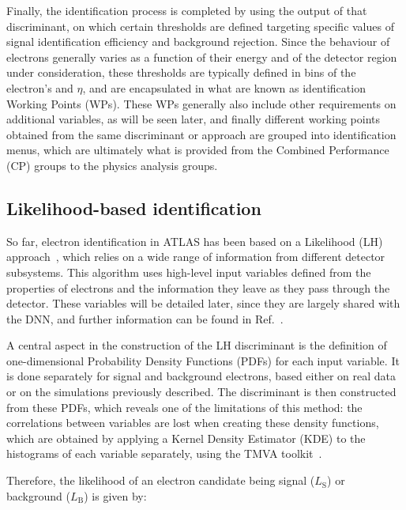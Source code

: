 Finally, the identification process is completed by using the output of that discriminant, on which certain thresholds are defined targeting specific values of signal identification efficiency and background rejection. Since the behaviour of electrons generally varies as a function of their energy and of the detector region under consideration, these thresholds are typically defined in bins of the electron’s \et and $\eta$, and are encapsulated in what are known as identification Working Points (WPs). These WPs generally also include other requirements on additional variables, as will be seen later, and finally different working points obtained from the same discriminant or approach are grouped into identification menus, which are ultimately what is provided from the Combined Performance (CP) groups to the physics analysis groups.

\subsection{Likelihood-based identification}

So far, electron identification in ATLAS has been based on a Likelihood (LH) approach~\cite{Aad:2684552,Aaboud:2657964}, which relies on a wide range of information from different detector subsystems. This algorithm uses high-level input variables defined from the properties of electrons and the information they leave as they pass through the detector. These variables will be detailed later, since they are largely shared with the DNN, and further information can be found in Ref.~\cite{Aaboud:2657964}.

A central aspect in the construction of the LH discriminant is the definition of one-dimensional Probability Density Functions (PDFs) for each input variable. It is done separately for signal and background electrons, based either on real data or on the simulations previously described.
The discriminant is then constructed from these PDFs, which reveals one of the limitations of this method: the correlations between variables are lost when creating these density functions, which are obtained by applying a Kernel Density Estimator (KDE) to the histograms of each variable separately, using the TMVA toolkit~\cite{tmvatoolkit}. 

Therefore, the likelihood of an electron candidate being signal ($L_{\text{S}}$) or background ($L_{\text{B}}$) is given by:

